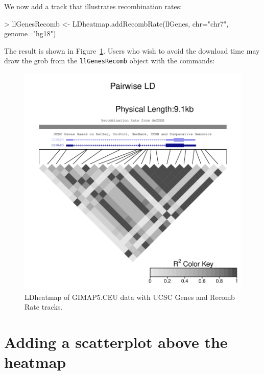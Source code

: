 \documentclass{article}
\begin{document}
We now add a track that illustrates recombination rates:
\begin{Schunk}
\begin{Sinput}
> llGenesRecomb <- LDheatmap.addRecombRate(llGenes, chr="chr7", genome="hg18")
\end{Sinput}
\end{Schunk}
The result is shown in Figure~\ref{fig:fig3}. Users who wish to 
avoid the download time may draw the
grob from the \texttt{llGenesRecomb} object with the commands:
\begin{Schunk}
\end{Schunk}
\begin{figure}
\begin{center}
\includegraphics{addTracks-fig3}
\end{center}
\caption{LDheatmap of GIMAP5.CEU data with UCSC Genes and Recomb Rate tracks.}
\label{fig:fig3}
\end{figure}

\section{Adding a scatterplot above the heatmap}
\end{document}
